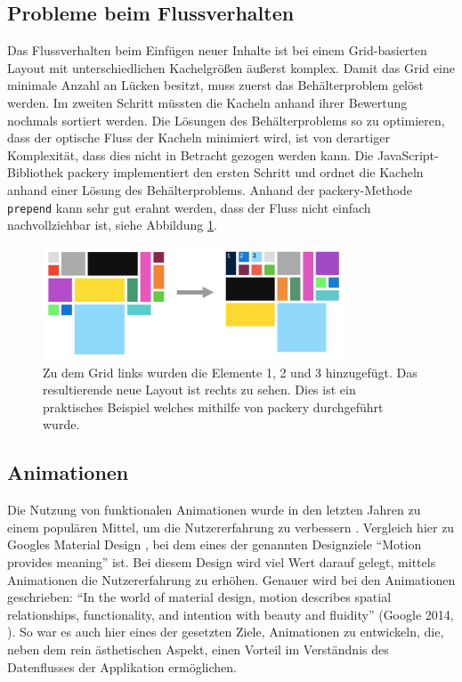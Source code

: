 \documentclass[12pt,twoside]{book}
\begin{document}
  \subsection{Probleme beim Flussverhalten}
  Das Flussverhalten beim Einfügen neuer Inhalte ist bei einem Grid-basierten Layout mit unterschiedlichen Kachelgrößen äußerst komplex. Damit das Grid eine minimale Anzahl an Lücken besitzt, muss zuerst das Behälterproblem gelöst werden. Im zweiten Schritt müssten die Kacheln anhand ihrer Bewertung nochmals sortiert werden. Die Lösungen des Behälterproblems so zu optimieren, dass der optische Fluss der Kacheln minimiert wird, ist von derartiger Komplexität, dass dies nicht in Betracht gezogen werden kann. Die JavaScript-Bibliothek packery \cite{packery} implementiert den ersten Schritt und ordnet die Kacheln anhand einer Lösung des Behälterproblems. Anhand der packery-Methode \texttt{prepend} kann sehr gut erahnt werden, dass der Fluss nicht einfach nachvollziehbar ist, siehe Abbildung \ref{fig:grid_flow}.

  \begin{figure}[htbp]
    \centering
    \includegraphics[width=0.8\textwidth]{images/grid_flow.png}
    \caption{Zu dem Grid links wurden die Elemente 1, 2 und 3 hinzugefügt. Das resultierende neue Layout ist rechts zu sehen. Dies ist ein praktisches Beispiel welches mithilfe von packery durchgeführt wurde.}
    \label{fig:grid_flow}
  \end{figure}


\subsection{Animationen}

Die Nutzung von funktionalen Animationen wurde in den letzten Jahren zu einem populären Mittel, um die Nutzererfahrung zu verbessern \cite{functionalanimations}. Vergleich hier zu Googles Material Design \cite{materialdesign}, bei dem eines der genannten Designziele ``Motion provides meaning'' ist. Bei diesem Design wird viel Wert darauf gelegt, mittels Animationen die Nutzererfahrung zu erhöhen. Genauer wird bei den Animationen geschrieben: ``In the world of material design, motion describes spatial relationships, functionality, and intention with beauty and fluidity'' (Google 2014, \cite{materialdesign}).
So war es auch hier eines der gesetzten Ziele, Animationen zu entwickeln, die, neben dem rein ästhetischen Aspekt, einen Vorteil im Verständnis des Datenflusses der Applikation ermöglichen.
\end{document}
